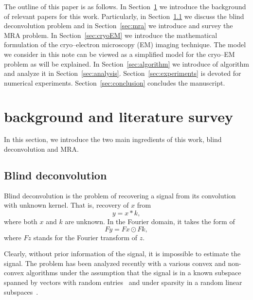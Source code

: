 \documentclass[journal]{IEEEtran}
\numberwithin{equation}{section}
\numberwithin{figure}{section}
\theoremstyle{plain}
\theoremstyle{definition}
\theoremstyle{remark}
\theoremstyle{plain}
\theoremstyle{remark}
\theoremstyle{plain}
\theoremstyle{plain}
\begin{document}
The outline of this paper is as follows. In Section~\ref{sec:literature} we introduce the background of relevant papers for this work. Particularly, in Section~\ref{sec:blind_deconvolution} we discuss the blind deconvolution problem and in Section~\ref{sec:mra} we introduce and survey the MRA problem. In Section~\ref{sec:cryoEM} we introduce the mathematical formulation of the cryo--electron microscopy (EM) imaging technique. The model we consider in this note can be viewed as a simplified model for the cryo--EM problem as will be explained. In Section~\ref{sec:algorithm} we introduce of algorithm and analyze it in Section~\ref{sec:analysis}. Section~\ref{sec:experiments} is devoted for numerical experiments. Section~\ref{sec:conclusion} concludes the manuscript.
 



\section{background and literature survey} \label{sec:literature}

In this section, we introduce the two main ingredients of this work, blind deconvolution and MRA.

\subsection{Blind deconvolution} \label{sec:blind_deconvolution}


Blind deconvolution is the problem of recovering a signal from its convolution with unknown kernel. That is, recovery of $x$ from
\begin{equation}
y = x\ast k,
\end{equation}
where both $x$ and $k$ are unknown. In the Fourier domain, it takes the form of 
\begin{equation}
Fy = Fx \odot Fk,
\end{equation}
where $Fz$ stands for the Fourier transform of $z$.

Clearly, without prior information of the signal, it is impossible to estimate the signal. The problem has been analyzed recently with a various convex and non-convex algorithms under the assumption that the signal is in a known  subspace spanned by vectors with random entries~\cite{ahmed2014blind,li2016rapid,ling2017blind} 
and under sparsity in a random linear subspaces~\cite{lee2017blind,li2016identifiability,kech2017optimal,ling2015self,chi2016guaranteed,li2015unified}. 
\end{document}
